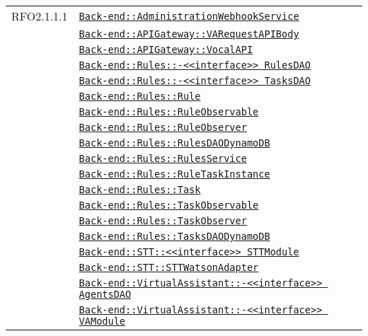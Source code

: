 \begin{longtable}{|>{\centering}m{3cm}|m{10cm}<{\centering}|}
RFO2.1.1.1 & \hyperref[Back-end::AdministrationWebhookService]{\texttt{Back-end::AdministrationWebhookService}}\\
& \hyperref[Back-end::APIGateway::VARequestAPIBody]{\texttt{Back-end::APIGateway::VARequestAPIBody}}\\
& \hyperref[Back-end::APIGateway::VocalAPI]{\texttt{Back-end::APIGateway::VocalAPI}}\\
& \hyperref[Back-end::Rules::<<interface>> RulesDAO]{\texttt{Back-end::Rules::-\linebreak <<interface>> RulesDAO}}\\
& \hyperref[Back-end::Rules::<<interface>> TasksDAO]{\texttt{Back-end::Rules::-\linebreak <<interface>> TasksDAO}}\\
& \hyperref[Back-end::Rules::Rule]{\texttt{Back-end::Rules::Rule}}\\
& \hyperref[Back-end::Rules::RuleObservable]{\texttt{Back-end::Rules::RuleObservable}}\\
& \hyperref[Back-end::Rules::RuleObserver]{\texttt{Back-end::Rules::RuleObserver}}\\
& \hyperref[Back-end::Rules::RulesDAODynamoDB]{\texttt{Back-end::Rules::RulesDAODynamoDB}}\\
& \hyperref[Back-end::Rules::RulesService]{\texttt{Back-end::Rules::RulesService}}\\
& \hyperref[Back-end::Rules::RuleTaskInstance]{\texttt{Back-end::Rules::RuleTaskInstance}}\\
& \hyperref[Back-end::Rules::Task]{\texttt{Back-end::Rules::Task}}\\
& \hyperref[Back-end::Rules::TaskObservable]{\texttt{Back-end::Rules::TaskObservable}}\\
& \hyperref[Back-end::Rules::TaskObserver]{\texttt{Back-end::Rules::TaskObserver}}\\
& \hyperref[Back-end::Rules::TasksDAODynamoDB]{\texttt{Back-end::Rules::TasksDAODynamoDB}}\\
& \hyperref[Back-end::STT::<<interface>> STTModule]{\texttt{Back-end::STT::<<interface>> STTModule}}\\
& \hyperref[Back-end::STT::STTWatsonAdapter]{\texttt{Back-end::STT::STTWatsonAdapter}}\\
& \hyperref[Back-end::VirtualAssistant::<<interface>> AgentsDAO]{\texttt{Back-end::VirtualAssistant::-\linebreak <<interface>> AgentsDAO}}\\
& \hyperref[Back-end::VirtualAssistant::<<interface>> VAModule]{\texttt{Back-end::VirtualAssistant::-\linebreak <<interface>> VAModule}}\\

\end{longtable}
